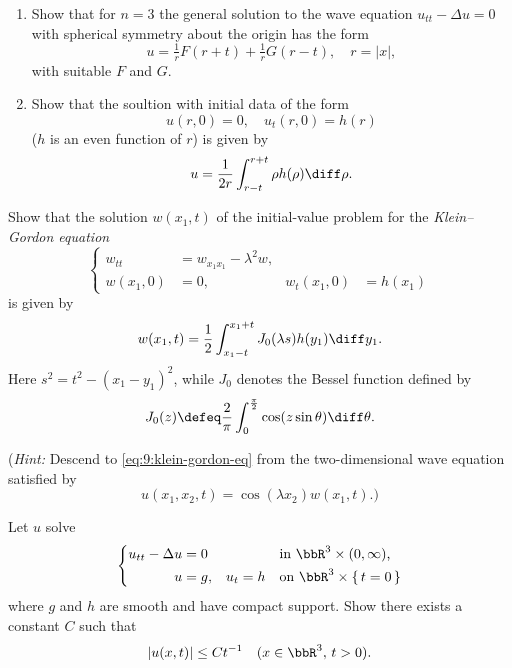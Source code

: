 \begin{problem}
  \begin{enumerate}[label=(\alph*),noitemsep]
  \item Show that for \(n=3\) the general solution to the wave equation
    \(u_{tt}-\Delta u=0\) with spherical symmetry about the origin has the
    form
    \[
      u=\tfrac{1}{r}F(r+t)+\tfrac{1}{r}G(r-t),\quad r=|x|,
    \]
    with suitable \(F\) and \(G\).
  \item Show that the soultion with initial data of the form
    \[
      u(r,0)=0,\quad u_t(r,0)=h(r)
    \]
    (\(h\) is an even function of \(r\)) is given by
    \[
      u=\frac{1}{2r}\int_{r-t}^{r+t} \rho h(\rho)\diff \rho.
    \]
  \end{enumerate}
\end{problem}
\begin{solution}
\end{solution}
\newpage

\begin{problem}
  Show that the solution \(w(x_1,t)\) of the initial-value problem for the
  \emph{Klein--Gordon equation}
  \begin{equation}
    \label{eq:9:klein-gordon-eq}
    \left\{
      \begin{aligned}
        w_{tt}&=w_{x_1x_1}-\lambda^2w,\\
        w(x_1,0)&=0,&w_t(x_1,0)&=h(x_1)
      \end{aligned}
    \right.
  \end{equation}
  is given by
  \[
    w(x_1,t)=\frac{1}{2}\int_{x_1-t}^{x_1+t}J_0(\lambda s) h(y_1)\diff y_1.
  \]
  Here \(s^2=t^2-(x_1-y_1)^2\), while \(J_0\) denotes the Bessel function
  defined by
  \[
    J_0(z)\defeq \frac{2}{\pi}\int_0^{\frac{\pi}{2}}\cos(z\sin\theta)\diff\theta.
  \]

  \noindent (\emph{Hint:} Descend to \eqref{eq:9:klein-gordon-eq} from the
  two-dimensional wave equation satisfied by
  \[
    u(x_1,x_2,t)=\cos(\lambda x_2)w(x_1,t).\text{)}
  \]
\end{problem}
\begin{solution}
\end{solution}
\newpage

\begin{problem}
  Let \(u\) solve
  \[
    \left\{
      \begin{aligned}
        u_{tt}-\Delta u&=0&&&&\text{in \(\bbR^3\times(0,\infty)\),}\\
        u&=g,&u_t&=h&&\text{on \(\bbR^3\times\{\,t=0\,\}\)}
      \end{aligned}
    \right.
  \]
  where \(g\) and \(h\) are smooth and have compact support. Show there
  exists a constant \(C\) such that
  \[
    |u(x,t)|\leq Ct^{-1}\quad(x\in\bbR^3,\,t>0).
  \]
\end{problem}
\begin{solution}
\end{solution}

